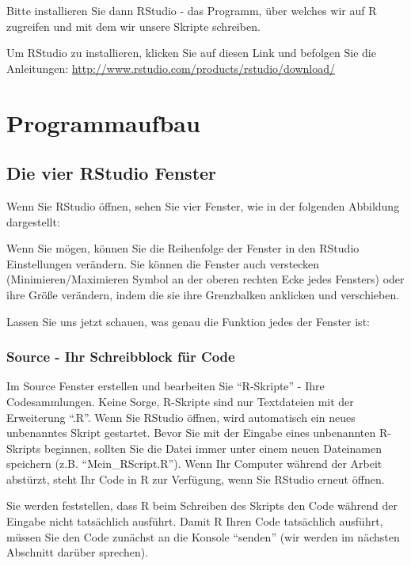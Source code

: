 \documentclass[
]{book}
\begin{document}
Bitte installieren Sie dann RStudio - das Programm, über welches wir auf R zugreifen und mit dem wir unsere Skripte schreiben.

Um RStudio zu installieren, klicken Sie auf diesen Link und befolgen Sie die Anleitungen: \url{http://www.rstudio.com/products/rstudio/download/}

\hypertarget{programmaufbau}{%
\chapter{Programmaufbau}\label{programmaufbau}}

\hypertarget{die-vier-rstudio-fenster}{%
\section{Die vier RStudio Fenster}\label{die-vier-rstudio-fenster}}

Wenn Sie RStudio öffnen, sehen Sie vier Fenster, wie in der folgenden Abbildung dargestellt:

Wenn Sie mögen, können Sie die Reihenfolge der Fenster in den RStudio Einstellungen verändern.
Sie können die Fenster auch verstecken (Minimieren/Maximieren Symbol an der oberen rechten Ecke jedes Fensters) oder ihre Größe verändern, indem die sie ihre Grenzbalken anklicken und verschieben.

Lassen Sie uns jetzt schauen, was genau die Funktion jedes der Fenster ist:

\hypertarget{source---ihr-schreibblock-fuxfcr-code}{%
\subsection{Source - Ihr Schreibblock für Code}\label{source---ihr-schreibblock-fuxfcr-code}}

Im Source Fenster erstellen und bearbeiten Sie ``R-Skripte'' - Ihre Codesammlungen. Keine Sorge, R-Skripte sind nur Textdateien mit der Erweiterung ``.R''.
Wenn Sie RStudio öffnen, wird automatisch ein neues unbenanntes Skript gestartet.
Bevor Sie mit der Eingabe eines unbenannten R-Skripts beginnen, sollten Sie die Datei immer unter einem neuen Dateinamen speichern (z.B. ``Mein\_RScript.R'').
Wenn Ihr Computer während der Arbeit abstürzt, steht Ihr Code in R zur Verfügung, wenn Sie RStudio erneut öffnen.

Sie werden feststellen, dass R beim Schreiben des Skripts den Code während der Eingabe nicht tatsächlich ausführt. Damit R Ihren Code tatsächlich ausführt, müssen Sie den Code zunächst an die Konsole ``senden'' (wir werden im nächsten Abschnitt darüber sprechen).
\end{document}

